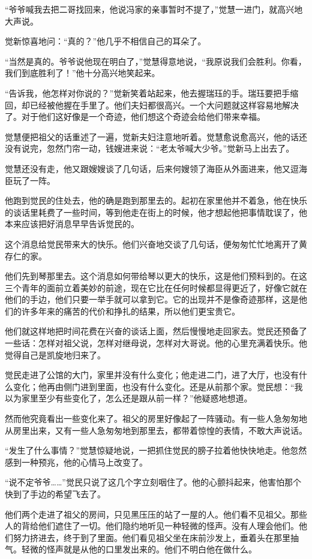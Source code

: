 \par “爷爷喊我去把二哥找回来，他说冯家的亲事暂时不提了，”觉慧一进门，就高兴地大声说。
\par 觉新惊喜地问：“真的？”他几乎不相信自己的耳朵了。
\par “当然是真的。爷爷说他现在明白了，”觉慧得意地说，“我原说我们会胜利。你看，我们到底胜利了！”他十分高兴地笑起来。
\par “告诉我，他怎样对你说的？”觉新笑着站起来，他去握瑞珏的手。瑞珏要把手缩回，却已经被他握在手里了。他们夫妇都很高兴。一个大问题就这样容易地解决了。对于他们这好像是一个奇迹，他们想这个奇迹会给他们带来幸福。
\par 觉慧便把祖父的话重述了一遍，觉新夫妇注意地听着。觉慧愈说愈高兴，他的话还没有说完，忽然门帘一动，钱嫂进来说：“老太爷喊大少爷。”觉新马上出去了。
\par 觉慧还没有走，他又跟嫂嫂谈了几句话，后来何嫂领了海臣从外面进来，他又逗海臣玩了一阵。
\par 他跑到觉民的住处去，他的确是跑到那里去的。起初在家里他并不着急，他在快乐的谈话里耗费了一些时间，等到他走在街上的时候，他才想起他把事情耽误了，他本来应该把好消息早早告诉觉民的。
\par 这个消息给觉民带来大的快乐。他们兴奋地交谈了几句话，便匆匆忙忙地离开了黄存仁的家。
\par 他们先到琴那里去。这个消息如何带给琴以更大的快乐，这是他们预料到的。在这三个青年的面前立着美妙的前途，现在它比在任何时候都显得更近了，好像它就在他们的手边，他们只要一举手就可以拿到它。它的出现并不是像奇迹那样，这是他们的许多年来的痛苦的代价和挣扎的结果，所以他们更宝贵它。
\par 他们就这样地把时间花费在兴奋的谈话上面，然后慢慢地走回家去。觉民还预备了一些话：怎样对祖父说，怎样对继母说，怎样对大哥说。他的心里充满着快乐。他觉得自己是凯旋地归来了。
\par 觉民走进了公馆的大门，家里并没有什么变化；他走进二门，进了大厅，也没有什么变化；他再由侧门进到里面，也没有什么变化。还是从前那个家。觉民想：“我以为家里至少有些变化了，怎么还是跟从前一样？”他疑惑地想道。
\par 然而他究竟看出一些变化来了。祖父的房里好像起了一阵骚动。有一些人急匆匆地从房里出来，又有一些人急匆匆地到那里去，都带着惊惶的表情，不敢大声说话。
\par “发生了什么事情？”觉慧惊疑地说，一把抓住觉民的膀子拉着他快快地走。他忽然感到一种预兆，他的心情马上改变了。
\par “说不定爷爷……”觉民只说了这几个字立刻咽住了。他的心颤抖起来，他害怕那个快到了手边的希望飞去了。
\par 他们两个走进了祖父的房间，只见黑压压的站了一屋的人。他们看不见祖父。那些人的背给他们遮住了一切。他们隐约地听见一种轻微的怪声。没有人理会他们。他们努力挤进去，终于到了里面。他们看见祖父坐在床前沙发上，垂着头在那里抽气。轻微的怪声就是从他的口里发出来的。他们不明白他在做什么。
